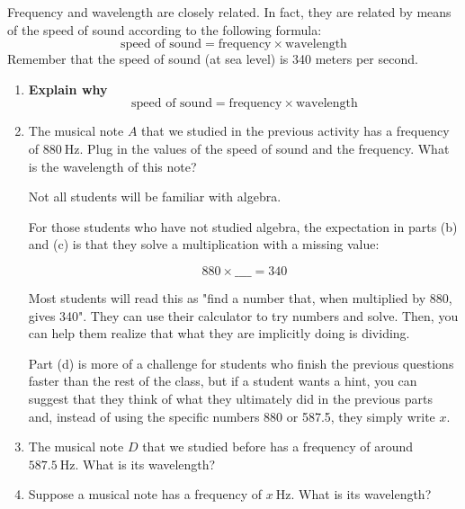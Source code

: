 \documentclass[12pt,noauthor,nooutcomes,hints,handout]{ximera}
\begin{document}
\begin{question}
Frequency and wavelength are closely related. In fact, they are related by means of the speed of sound according to the following formula:
\[
\text{speed of sound} = \text{frequency} \times \text{wavelength}
\]
Remember that the speed of sound (at sea level) is 340 meters per second. 
\begin{enumerate}
\item \textbf{Explain why}
\[
\text{speed of sound} = \text{frequency} \times \text{wavelength}
\]

\item The musical note $A$ that we studied in the previous activity has a frequency of $880~\mathrm{Hz}$. Plug in the values of the speed of sound and the frequency. What is the wavelength of this note? 

\answerspace

\begin{instructorNotes}
Not all students will be familiar with algebra. 

For those students who have not studied algebra, the expectation in parts (b) and (c) is that they solve a multiplication with a missing value:

\[
880 \times \_\_\_\_ = 340
\]

Most students will read this as "find a number that, when multiplied by 880, gives 340". They can use their calculator to try numbers and solve. Then, you can help them realize that what they are implicitly doing is dividing.

Part (d) is more of a challenge for students who finish the previous questions faster than the rest of the class, but if a student wants a hint, you can suggest that they think of what they ultimately did in the previous parts and, instead of using the specific numbers 880 or 587.5, they simply write $x$.
\end{instructorNotes}

\item  The musical note $D$ that we studied before has a frequency of around $587.5~\mathrm{Hz}$. What is its wavelength?

\answerspace


\item Suppose a musical note has a frequency of $x~\mathrm{Hz}$.  What is its wavelength?



\end{enumerate}
\end{question}
\end{document}
